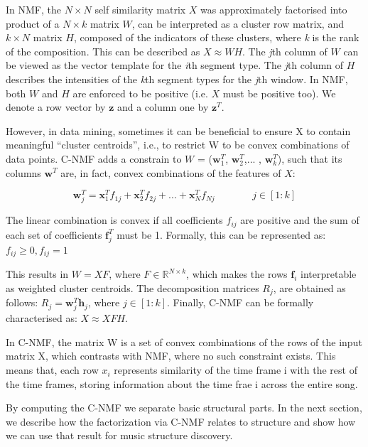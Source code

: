 In NMF, the $N \times N$ self similarity matrix $X$ was approximately factorised into product of a $N \times k$ matrix $W$, can be interpreted as a cluster row matrix, and $k \times N$ matrix $H$, composed of the indicators of these clusters, where \textit{k} is the rank of the composition. This can be described as $X \approx WH$. The \textit{j}th column of $W$ can be viewed as the vector template for the \textit{i}th segment type. The \textit{j}th column of $H$ describes the intensities of the \textit{k}th segment types for the \textit{j}th window. In NMF, both $W$ and $H$ are enforced to be positive (i.e. $X$ must be positive too). We denote a row vector by $\boldsymbol{z}$ and a column one by $\boldsymbol{z}^{T}$.

However, in data mining, sometimes it can be beneficial to ensure X to contain meaningful “cluster centroids”, i.e., to restrict W to be convex combinations of data points.
C-NMF adds a constrain to $W$ = ($\boldsymbol{w}_{1}^{T}$, $\boldsymbol{w}_{2}^{T}$,... ,  $\boldsymbol{w}_{k}^{T}$),  such that its columns  $\boldsymbol{w}^{T}$  are, in fact,  convex combinations of the features of $X$:

\begin{equation}
\boldsymbol{w}_{j}^{T} = \boldsymbol{x}_{1}^{T}f_{1j} + \boldsymbol{x}_{2}^{T}f_{2j} + ... + \boldsymbol{x}_{N}^{T}f_{Nj}  \hspace{45pt}   j \in [1 : k]
\end{equation}

The linear combination is convex if all coefficients $f_{ij}$ are positive and the sum of each set of coefficients  $\boldsymbol{f}^{T}_{j}$ must be 1. Formally, this can be represented as:
$f_{ij} \geq 0,  f_{ij} = 1 $

This results in $W = XF$, where $F \in \mathbb{R}^{N \times k}$, which makes the rows $\boldsymbol{f}_{i}$ interpretable as weighted cluster centroids. The decomposition matrices $R_{j}$, are obtained as follows:  $R_{j} =  \boldsymbol{w}^{T}_{j}\boldsymbol{h}_{j}$, where $j \in [1 : k]$. Finally, C-NMF can be formally characterised as: $X \approx XFH$.

In C-NMF, the matrix W is a set of convex combinations of the rows of the input matrix X, which contrasts with NMF, where no such constraint exists. This means that, each row $x_{i}$ represents similarity of the time frame i with the rest of the time frames, storing information about the time frae i across the entire song.

By computing the C-NMF we separate basic structural parts. In the next section, we describe how the factorization via C-NMF relates to structure and show how we can use that result for music structure discovery. 


